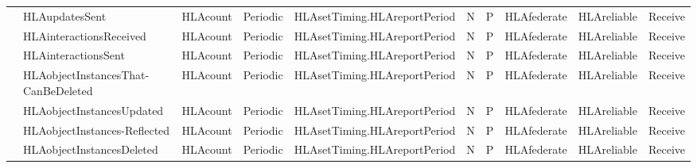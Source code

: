 \begin{landscape}
\begin{momtabletypeset}[8.00]
{{\begin{tabular}{|Y{90.88pt}|Y{96.62pt}|Y{69.32pt}|Y{45.50pt}|Y{96.56pt}|Y{24.62pt}|Y{24.62pt}|Y{48.56pt}|Y{65.24pt}|Y{36.31pt}|}
                    & HLAupdatesSent                               & HLAcount                                    & Periodic                                                   & HLAsetTiming.\allowbreak{}\newline HLAreportPeriod & N & P & HLAfederate & HLAreliable & Receive \\
                    & HLAinteractionsReceived                      & HLAcount                                    & Periodic                                                   & HLAsetTiming.\allowbreak{}\newline HLAreportPeriod & N & P & HLAfederate & HLAreliable & Receive \\
                    & HLAinteractionsSent                          & HLAcount                                    & Periodic                                                   & HLAsetTiming.\allowbreak{}\newline HLAreportPeriod & N & P & HLAfederate & HLAreliable & Receive \\
                    & HLAobjectInstancesThat-\newline CanBeDeleted & HLAcount                                    & Periodic                                                   & HLAsetTiming.\allowbreak{}\newline HLAreportPeriod & N & P & HLAfederate & HLAreliable & Receive \\
                    & HLAobjectInstancesUpdated                    & HLAcount                                    & Periodic                                                   & HLAsetTiming.\allowbreak{}\newline HLAreportPeriod & N & P & HLAfederate & HLAreliable & Receive \\
                    & HLAobjectInstances-\newline Reflected        & HLAcount                                    & Periodic                                                   & HLAsetTiming.\allowbreak{}\newline HLAreportPeriod & N & P & HLAfederate & HLAreliable & Receive \\
                    & HLAobjectInstancesDeleted                    & HLAcount                                    & Periodic                                                   & HLAsetTiming.\allowbreak{}\newline HLAreportPeriod & N & P & HLAfederate & HLAreliable & Receive \\

\end{tabular}}}
\end{momtabletypeset}
\end{landscape}
